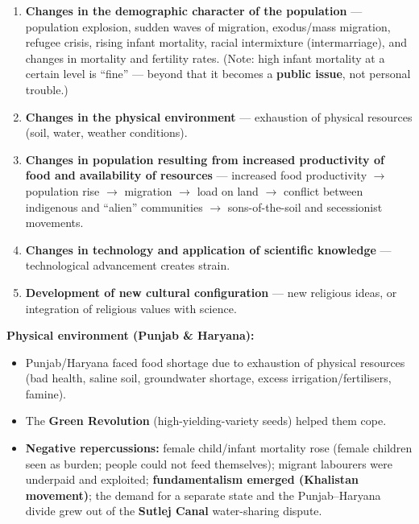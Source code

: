 \begin{DataFact}
\begin{enumerate}
\item \textbf{Changes in the demographic character of the population} --- population explosion, sudden waves of migration, exodus/mass migration, refugee crisis, rising infant mortality, racial intermixture (intermarriage), and changes in mortality and fertility rates. (Note: high infant mortality at a certain level is ``fine'' --- beyond that it becomes a \textbf{public issue}, not personal trouble.)
\item \textbf{Changes in the physical environment} --- exhaustion of physical resources (soil, water, weather conditions).
\item \textbf{Changes in population resulting from increased productivity of food and availability of resources} --- increased food productivity $\rightarrow$ population rise $\rightarrow$ migration $\rightarrow$ load on land $\rightarrow$ conflict between indigenous and ``alien'' communities $\rightarrow$ sons-of-the-soil and secessionist movements.
\item \textbf{Changes in technology and application of scientific knowledge} --- technological advancement creates strain.
\item \textbf{Development of new cultural configuration} --- new religious ideas, or integration of religious values with science.
\end{enumerate}
\end{DataFact}

\begin{ExampleBox}
\textbf{Physical environment (Punjab \& Haryana):}
\begin{itemize}
\item Punjab/Haryana faced food shortage due to exhaustion of physical resources (bad health, saline soil, groundwater shortage, excess irrigation/fertilisers, famine).
\item The \textbf{Green Revolution} (high-yielding-variety seeds) helped them cope.
\item \textbf{Negative repercussions:} female child/infant mortality rose (female children seen as burden; people could not feed themselves); migrant labourers were underpaid and exploited; \textbf{fundamentalism emerged (Khalistan movement)}; the demand for a separate state and the Punjab--Haryana divide grew out of the \textbf{Sutlej Canal} water-sharing dispute.
\end{itemize}
\end{ExampleBox}

